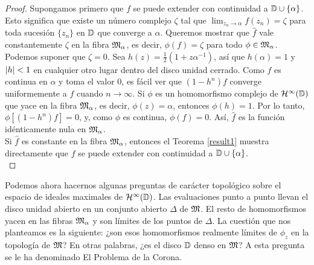 \begin{proof}
    Supongamos primero que $f$ se puede extender con continuidad a $\mathbb{D} \cup \{ \alpha\}$. Esto significa que existe un número complejo $\zeta$ tal que $\lim_{z_n \rightarrow \alpha} f(z_n) = \zeta$ para toda sucesión $\{z_n\}$ en $\mathbb{D}$ que converge a $\alpha$. Queremos mostrar que $\widehat f$ vale constantemente $\zeta$ en la fibra $\mathfrak{M}_\alpha$, es decir, $\phi(f) = \zeta$ para todo $\phi \in \mathfrak{M}_\alpha$. \\

    Podemos suponer que $\zeta = 0$. Sea $h(z) = \frac{1}{2} (1 + z \alpha^{-1})$, así que $h(\alpha) = 1$ y $\left\lvert h\right\rvert < 1$ en cualquier otro lugar dentro del disco unidad cerrado. Como $f$ es continua en $\alpha$ y toma el valor $0$, es fácil ver que $(1 - h^n) f$ converge uniformemente a $f$ cuando $n \rightarrow \infty$. Si $\phi$ es un homomorfismo complejo de $\mathcal{H}^{\infty}(\mathbb{D})$ que yace en la fibra $\mathfrak{M}_\alpha$, es decir, $\phi (z) = \alpha$, entonces $\phi (h) = 1$. Por lo tanto, $\phi [(1 - h^n)f] = 0$, y, como $\phi$ es continua, $\phi (f) = 0$. Así, $\widehat f$ es la función idénticamente nula en $\mathfrak{M}_\alpha$. \\


    Si $\widehat f$ es constante en la fibra $\mathfrak{M}_\alpha$, entonces el Teorema \ref{result1} muestra directamente que $f$ se puede extender con continuidad a $\mathbb{D} \cup \{ \alpha \}$. \\
\end{proof}


Podemos ahora hacernos algunas preguntas de carácter topológico sobre el espacio de ideales maximales de $\mathcal{H}^{\infty}(\mathbb{D})$. Las evaluaciones punto a punto llevan el disco unidad abierto en un conjunto abierto $\Delta$ de $\mathfrak{M}$. El resto de homomorfismos yacen en las fibras $\mathfrak{M}_\alpha$ y son límites de los puntos de $\Delta$. La cuestión que nos planteamos es la siguiente: ¿son esos homomorfismos realmente límites de $\phi_z$ en la topología de $\mathfrak{M}$? En otras palabras, ¿es el disco $\mathbb{D}$ denso en $\mathfrak{M}$? A esta pregunta se le ha denominado El Problema de la Corona. \\

